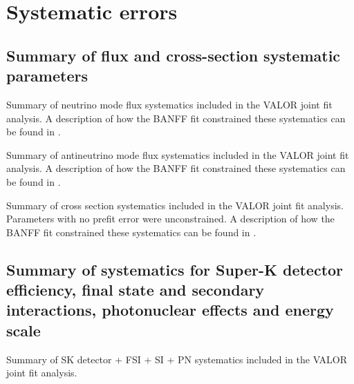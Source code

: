 \section{Systematic errors}
\label{app:systematics}

\subsection{Summary of flux and cross-section systematic parameters}

\begin{table}[h]
	
	\caption{Summary of neutrino mode flux systematics included in the VALOR joint fit analysis. A description of how the BANFF fit constrained these systematics can be found in \cite{BANFF2017}.}
	\label{tab:sys_flux_fhc_err}
\end{table}

\begin{table}[h]
	
	\caption{Summary of antineutrino mode flux systematics included in the VALOR joint fit analysis. A description of how the BANFF fit constrained these systematics can be found in \cite{BANFF2017}.}
	\label{tab:sys_flux_rhc_err}
\end{table}

\begin{table}[h]
	\begin{adjustbox}{width=\textwidth, totalheight=\textheight, keepaspectratio}
		
	\end{adjustbox}
	\caption{Summary of cross section systematics included in the VALOR joint fit analysis. Parameters with no prefit error were unconstrained. A description of how the BANFF fit constrained these systematics can be found in \cite{BANFF2017}.}
	\label{tab:sys_xsec_err}
\end{table}

\FloatBarrier
\subsection{Summary of systematics for Super-K detector efficiency, final state and secondary interactions, photonuclear effects and energy scale}

\begin{table}[h]
	\begin{adjustbox}{width=\textwidth, totalheight=\textheight, keepaspectratio}
		
	\end{adjustbox}
	\caption{Summary of SK detector + FSI + SI + PN systematics included in the VALOR joint fit analysis.}
	\label{tab:sys_sk_err}
\end{table}

